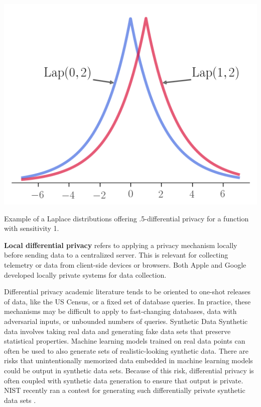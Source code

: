 \documentclass[nobib]{tufte-handout}
\begin{document}
\begin{marginfigure} \includegraphics[width=\linewidth]{laplace}
\caption{Example of a Laplace distributions offering .5-differential privacy for
a function with sensitivity 1.} \label{fig:laplace} \end{marginfigure}

\textbf{Local differential privacy} refers to applying a privacy mechanism
locally before sending data to a centralized server. This is relevant for
collecting telemetry or data from client-side devices or browsers. Both
Apple\cite{apple-local-differential-privacy} and Google
\cite{erlingsson2014rappor} developed locally private systems for data
collection.

Differential privacy academic literature tends to be oriented to one-shot
releases of data, like the US Census, or a fixed set of database queries. In
practice, these mechanisms may be difficult to apply to fast-changing databases,
data with adversarial inputs, or unbounded numbers of queries. Synthetic Data
Synthetic data involves taking real data and generating fake data sets that
preserve statistical properties. Machine learning models trained on real data
points can often be used to also generate sets of realistic-looking synthetic
data. There are risks that unintentionally memorized data embedded in machine
learning models could be output in synthetic data sets. Because of this risk,
differential privacy is often coupled with synthetic data generation to ensure
that output is private. NIST recently ran a contest for generating such
differentially private synthetic data sets \cite{nist-synthetic-data}.
\end{document}
